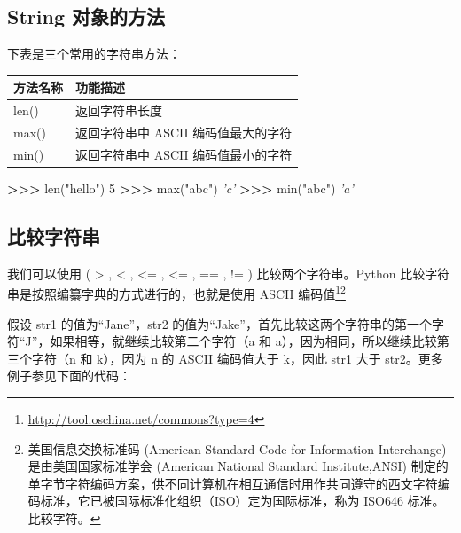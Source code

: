 \documentclass[]{ctexbook}
\newenvironment{Shaded}{\begin{snugshade}}{\end{snugshade}}
\newcommand{\BuiltInTok}[1]{#1}
\newcommand{\CommentTok}[1]{\textcolor[rgb]{0.56,0.35,0.01}{\textit{#1}}}
\newcommand{\DecValTok}[1]{\textcolor[rgb]{0.00,0.00,0.81}{#1}}
\newcommand{\NormalTok}[1]{#1}
\newcommand{\OperatorTok}[1]{\textcolor[rgb]{0.81,0.36,0.00}{\textbf{#1}}}
\newcommand{\StringTok}[1]{\textcolor[rgb]{0.31,0.60,0.02}{#1}}
\renewcommand{\href}[2]{#2\footnote{\url{#1}}}
\begin{document}
\hypertarget{string-ux5bf9ux8c61ux7684ux65b9ux6cd5}{%
\subsection{String 对象的方法}\label{string-ux5bf9ux8c61ux7684ux65b9ux6cd5}}

下表是三个常用的字符串方法：

\begin{longtable}[]{@{}ll@{}}
\toprule
方法名称 & 功能描述\tabularnewline
\midrule
\endhead
len() & 返回字符串长度\tabularnewline
max() & 返回字符串中 ASCII 编码值最大的字符\tabularnewline
min() & 返回字符串中 ASCII 编码值最小的字符\tabularnewline
\bottomrule
\end{longtable}

\begin{Shaded}
\begin{Highlighting}[]
\OperatorTok{>>>} \BuiltInTok{len}\NormalTok{(}\StringTok{"hello"}\NormalTok{)}
\DecValTok{5}
\OperatorTok{>>>} \BuiltInTok{max}\NormalTok{(}\StringTok{"abc"}\NormalTok{)}
\CommentTok{'c'}
\OperatorTok{>>>} \BuiltInTok{min}\NormalTok{(}\StringTok{"abc"}\NormalTok{)}
\CommentTok{'a'}
\end{Highlighting}
\end{Shaded}

\hypertarget{ux6bd4ux8f83ux5b57ux7b26ux4e32}{%
\subsection{比较字符串}\label{ux6bd4ux8f83ux5b57ux7b26ux4e32}}

我们可以使用 ( \textgreater{} , \textless{} , \textless= , \textless= , == , != ) 比较两个字符串。Python 比较字符串是按照编纂字典的方式进行的，也就是使用 \href{http://tool.oschina.net/commons?type=4}{ASCII 编码值}\footnote{美国信息交换标准码 (American Standard Code for Information Interchange) 是由美国国家标准学会 (American National Standard Institute,ANSI) 制定的单字节字符编码方案，供不同计算机在相互通信时用作共同遵守的西文字符编码标准，它已被国际标准化组织（ISO）定为国际标准，称为 ISO646 标准。比较字符。}

假设 str1 的值为``Jane''，str2 的值为``Jake''，首先比较这两个字符串的第一个字符``J''，如果相等，就继续比较第二个字符（a 和 a），因为相同，所以继续比较第三个字符（n 和 k），因为 n 的 ASCII 编码值大于 k，因此 str1 大于 str2。更多例子参见下面的代码：
\end{document}
